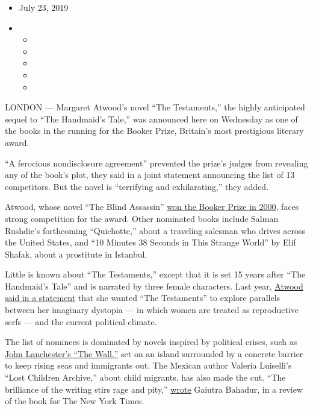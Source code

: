 \begin{itemize}
\item
  July 23, 2019
\item
  \begin{itemize}
  \item
  \item
  \item
  \item
  \item
  \end{itemize}
\end{itemize}

LONDON --- Margaret Atwood's novel ``The Testaments,'' the highly
anticipated sequel to ``The Handmaid's Tale,'' was announced here on
Wednesday as one of the books in the running for the Booker Prize,
Britain's most prestigious literary award.

``A ferocious nondisclosure agreement'' prevented the prize's judges
from revealing any of the book's plot, they said in a joint statement
announcing the list of 13 competitors. But the novel is ``terrifying and
exhilarating,'' they added.

Atwood, whose novel ``The Blind Assassin''
\href{https://www.nytimes3xbfgragh.onion/2000/11/08/world/margaret-atwood-is-the-winner-of-britain-s-top-fiction-award.html?searchResultPosition=2}{won
the Booker Prize in 2000}, faces strong competition for the award. Other
nominated books include Salman Rushdie's forthcoming ``Quichotte,''
about a traveling salesman who drives across the United States, and ``10
Minutes 38 Seconds in This Strange World'' by Elif Shafak, about a
prostitute in Istanbul.

Little is known about ``The Testaments,'' except that it is set 15 years
after ``The Handmaid's Tale'' and is narrated by three female
characters. Last year,
\href{https://www.nytimes3xbfgragh.onion/2018/11/28/books/margaret-atwood-sequel-handmaids-tale-testaments.html}{Atwood
said in a statement} that she wanted ``The Testaments'' to explore
parallels between her imaginary dystopia --- in which women are treated
as reproductive serfs --- and the current political climate.

The list of nominees is dominated by novels inspired by political
crises, such as
\href{https://www.nytimes3xbfgragh.onion/2019/03/05/books/review/john-lanchester-wall.html}{John
Lanchester's ``The Wall,''} set on an island surrounded by a concrete
barrier to keep rising seas and immigrants out. The Mexican author
Valeria Luiselli's ``Lost Children Archive,'' about child migrants, has
also made the cut. ``The brilliance of the writing stirs rage and
pity,''
\href{https://www.nytimes3xbfgragh.onion/2019/03/06/books/review/lost-children-archive-valeria-luiselli.html}{wrote}
Gaiutra Bahadur, in a review of the book for The New York Times.

